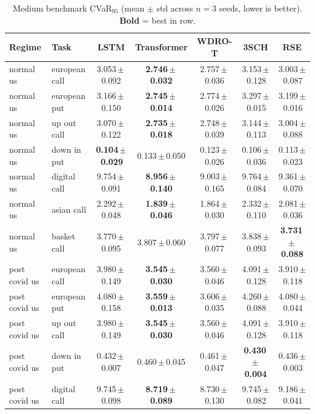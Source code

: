 \begin{table}[h]\centering\scriptsize
\caption{Medium benchmark CVaR$_{95}$ (mean $\pm$ std across $n=3$ seeds, lower is better).  \textbf{Bold} = best in row.}
\label{tab:medium_results}
\begin{tabular}{llccccc}
\toprule
Regime & Task & LSTM & Transformer & WDRO-T & 3SCH & RSE \\
\midrule
normal us & european call & 3.053\,$\pm$\,0.092 & \textbf{2.746\,$\pm$\,0.032} & 2.757\,$\pm$\,0.036 & 3.153\,$\pm$\,0.128 & 3.003\,$\pm$\,0.087 \\
normal us & european put & 3.166\,$\pm$\,0.150 & \textbf{2.745\,$\pm$\,0.014} & 2.774\,$\pm$\,0.026 & 3.297\,$\pm$\,0.015 & 3.199\,$\pm$\,0.016 \\
normal us & up out call & 3.070\,$\pm$\,0.122 & \textbf{2.735\,$\pm$\,0.018} & 2.748\,$\pm$\,0.039 & 3.144\,$\pm$\,0.113 & 3.004\,$\pm$\,0.088 \\
normal us & down in put & \textbf{0.104\,$\pm$\,0.029} & 0.133\,$\pm$\,0.050 & 0.123\,$\pm$\,0.026 & 0.106\,$\pm$\,0.036 & 0.113\,$\pm$\,0.023 \\
normal us & digital call & 9.754\,$\pm$\,0.091 & \textbf{8.956\,$\pm$\,0.140} & 9.003\,$\pm$\,0.165 & 9.764\,$\pm$\,0.084 & 9.361\,$\pm$\,0.070 \\
normal us & asian call & 2.292\,$\pm$\,0.048 & \textbf{1.839\,$\pm$\,0.046} & 1.864\,$\pm$\,0.030 & 2.332\,$\pm$\,0.110 & 2.081\,$\pm$\,0.036 \\
normal us & basket call & 3.770\,$\pm$\,0.095 & 3.807\,$\pm$\,0.060 & 3.797\,$\pm$\,0.077 & 3.838\,$\pm$\,0.093 & \textbf{3.731\,$\pm$\,0.088} \\
\midrule
post covid us & european call & 3.980\,$\pm$\,0.149 & \textbf{3.545\,$\pm$\,0.030} & 3.560\,$\pm$\,0.046 & 4.091\,$\pm$\,0.128 & 3.910\,$\pm$\,0.118 \\
post covid us & european put & 4.080\,$\pm$\,0.158 & \textbf{3.559\,$\pm$\,0.013} & 3.606\,$\pm$\,0.035 & 4.260\,$\pm$\,0.088 & 4.080\,$\pm$\,0.044 \\
post covid us & up out call & 3.980\,$\pm$\,0.149 & \textbf{3.545\,$\pm$\,0.030} & 3.560\,$\pm$\,0.046 & 4.091\,$\pm$\,0.128 & 3.910\,$\pm$\,0.118 \\
post covid us & down in put & 0.432\,$\pm$\,0.007 & 0.460\,$\pm$\,0.045 & 0.461\,$\pm$\,0.047 & \textbf{0.430\,$\pm$\,0.004} & 0.436\,$\pm$\,0.003 \\
post covid us & digital call & 9.745\,$\pm$\,0.098 & \textbf{8.719\,$\pm$\,0.089} & 8.730\,$\pm$\,0.130 & 9.745\,$\pm$\,0.082 & 9.186\,$\pm$\,0.041 \\

\end{tabular}
\end{table}
